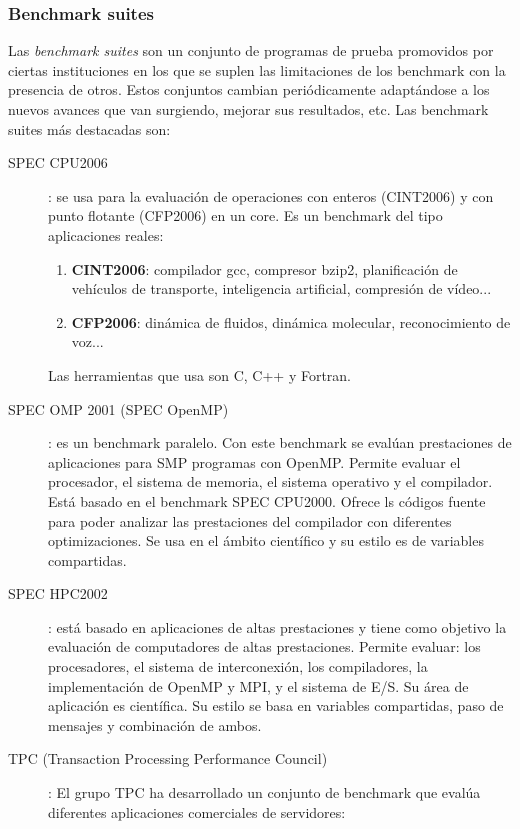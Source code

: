 \documentclass[10pt,a4paper,spanish]{report}
\begin{document}
\textcolor[rgb]{0.2,0.4,0.8}{\subsubsection{Benchmark suites}}
Las \textcolor[rgb]{0.2,0.4,0.8}{\textit{benchmark suites}} son un conjunto de programas de prueba promovidos por ciertas instituciones en los que se suplen las limitaciones de los benchmark con la presencia de otros. Estos conjuntos cambian periódicamente adaptándose a los nuevos avances que van surgiendo, mejorar sus resultados, etc. Las benchmark suites más destacadas son:
\begin{description}
  \item[SPEC CPU2006]: se usa para la evaluación de operaciones con enteros (CINT2006) y con punto flotante (CFP2006) en un core. Es un benchmark del tipo aplicaciones reales:
  \begin{enumerate}[\color{azul}{\bf $\heartsuit$}]
    \item \textbf{\textcolor[rgb]{0.2,0.4,0.8}{CINT2006}}: compilador gcc, compresor bzip2, planificación de vehículos de transporte, inteligencia artificial, compresión de vídeo...
    \item \textbf{\textcolor[rgb]{0.2,0.4,0.8}{CFP2006}}: dinámica de fluidos, dinámica molecular, reconocimiento de voz...
  \end{enumerate}
  Las herramientas que usa son C, C++ y Fortran.
  \item[SPEC OMP 2001 (SPEC OpenMP)]: es un benchmark paralelo. Con este benchmark se evalúan prestaciones de aplicaciones para SMP programas con OpenMP. Permite evaluar el procesador, el sistema de memoria, el sistema operativo y el compilador. Está basado en el benchmark SPEC CPU2000. Ofrece ls códigos fuente para poder analizar las prestaciones del compilador con diferentes optimizaciones. Se usa en el ámbito científico y su estilo es de variables compartidas.
  \item[SPEC HPC2002]: está basado en aplicaciones de altas prestaciones y tiene como objetivo la evaluación de computadores de altas prestaciones. Permite evaluar: los procesadores, el sistema de interconexión, los compiladores, la implementación de OpenMP y MPI, y el sistema de E/S. Su área de aplicación es científica. Su estilo se basa en variables compartidas, paso de mensajes y combinación de ambos. 
  \item[TPC (Transaction Processing Performance Council)]: El grupo TPC ha desarrollado un conjunto de benchmark que evalúa diferentes aplicaciones comerciales de servidores:

\end{description}
\end{document}
